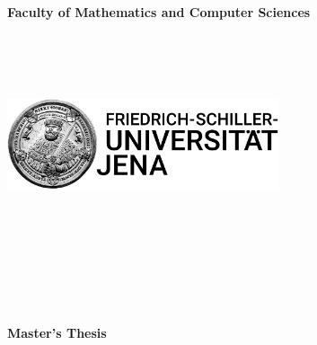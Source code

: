 \documentclass[a4paper,oneside,12pt]{report}
\begin{document}
\pagestyle{empty} %




\begin{center}
\textbf{Faculty of Mathematics and Computer Sciences\\}
\end{center}
\ \\
\ \\
\ \\
\begin{minipage}{\textwidth}
	\centering
		\includegraphics[width=0.60\textwidth]{Images/Logo_fsu.jpg}
		\label{fig:Javaterm}
\end{minipage}
\ \\
\ \\
\ \\
\ \\
\ \\
\ \\
\begin{center}
\begin{LARGE}
\textbf{Master's Thesis\\}
\end{LARGE}
\end{center}
\end{document}
